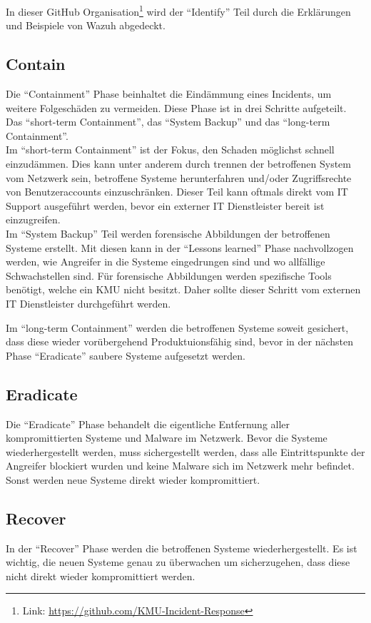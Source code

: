 In dieser GitHub Organisation\footnote{Link: \href{https://github.com/KMU-Incident-Response}{https://github.com/KMU-Incident-Response}} wird der ``Identify'' Teil durch die Erklärungen und Beispiele von Wazuh abgedeckt.

\subsection{Contain}
Die ``Containment'' Phase beinhaltet die Eindämmung eines Incidents, um weitere Folgeschäden zu vermeiden.
Diese Phase ist in drei Schritte aufgeteilt. 
Das ``short-term Containment'', das ``System Backup'' und das ``long-term Containment''.\\

Im ``short-term Containment'' ist der Fokus, den Schaden möglichst schnell einzudämmen.
Dies kann unter anderem durch trennen der betroffenen System vom Netzwerk sein, betroffene Systeme herunterfahren und/oder Zugriffsrechte von Benutzeraccounts einzuschränken.
Dieser Teil kann oftmals direkt vom IT Support ausgeführt werden, bevor ein externer IT Dienstleister bereit ist einzugreifen.\\

Im ``System Backup'' Teil werden forensische Abbildungen der betroffenen Systeme erstellt.
Mit diesen kann in der ``Lessons learned'' Phase nachvollzogen werden, wie Angreifer in die Systeme eingedrungen sind und wo allfällige Schwachstellen sind. 
Für forensische Abbildungen werden spezifische Tools benötigt, welche ein KMU nicht besitzt. 
Daher sollte dieser Schritt vom externen IT Dienstleister durchgeführt werden.

Im ``long-term Containment'' werden die betroffenen Systeme soweit gesichert, dass diese wieder vorübergehend Produktuionsfähig sind, bevor in der nächsten Phase ``Eradicate'' saubere Systeme aufgesetzt werden.

\subsection{Eradicate}
Die ``Eradicate'' Phase behandelt die eigentliche Entfernung aller kompromittierten Systeme und Malware im Netzwerk.
Bevor die Systeme wiederhergestellt werden, muss sichergestellt werden, dass alle Eintrittspunkte der Angreifer blockiert wurden und keine Malware sich im Netzwerk mehr befindet.
Sonst werden neue Systeme direkt wieder kompromittiert.

\subsection{Recover}
In der ``Recover'' Phase werden die betroffenen Systeme wiederhergestellt.
Es ist wichtig, die neuen Systeme genau zu überwachen um sicherzugehen, dass diese nicht direkt wieder kompromittiert werden. 



